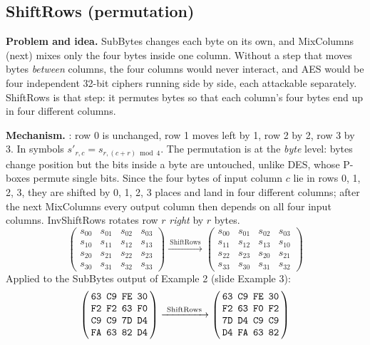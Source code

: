 \subsection{ShiftRows (permutation) \hot}

\textbf{Problem and idea.} SubBytes changes each byte on its own, and MixColumns (next) mixes only the four bytes inside one column. Without a step that moves bytes \emph{between} columns, the four columns would never interact, and AES would be four independent 32-bit ciphers running side by side, each attackable separately. ShiftRows is that step: it permutes bytes so that each column's four bytes end up in four different columns.

\textbf{Mechanism.} : row 0 is unchanged, row 1 moves left by 1, row 2 by 2, row 3 by 3. In symbols $s'_{r,c} = s_{r,(c + r) \bmod 4}$. The permutation is at the \emph{byte} level: bytes change position but the bits inside a byte are untouched, unlike DES, whose P-boxes permute single bits. Since the four bytes of input column $c$ lie in rows 0, 1, 2, 3, they are shifted by 0, 1, 2, 3 places and land in four different columns; after the next MixColumns every output column then depends on all four input columns. InvShiftRows rotates row $r$ \emph{right} by $r$ bytes.
\[
\begin{pmatrix}s_{00}&s_{01}&s_{02}&s_{03}\\s_{10}&s_{11}&s_{12}&s_{13}\\s_{20}&s_{21}&s_{22}&s_{23}\\s_{30}&s_{31}&s_{32}&s_{33}\end{pmatrix}
\xrightarrow{\ \text{ShiftRows}\ }
\begin{pmatrix}s_{00}&s_{01}&s_{02}&s_{03}\\s_{11}&s_{12}&s_{13}&s_{10}\\s_{22}&s_{23}&s_{20}&s_{21}\\s_{33}&s_{30}&s_{31}&s_{32}\end{pmatrix}
\]
Applied to the SubBytes output of Example 2 (slide Example 3):
\[
\aesM{63&C9&FE&30\\F2&F2&63&F0\\C9&C9&7D&D4\\FA&63&82&D4}
\xrightarrow{\ \text{ShiftRows}\ }
\aesM{63&C9&FE&30\\F2&63&F0&F2\\7D&D4&C9&C9\\D4&FA&63&82}
\]

